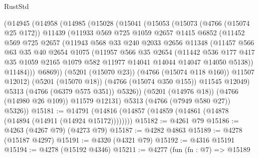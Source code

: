 \begin{lexlean}{RustStd}
\begin{coremodule}
      (@14945
        (@14958
          (@14985
            (@15028
              (@15041
                (@15053
                  (@15073
                    (@4766 (@15074 @25 @172))
                    @11439
                    (@11933
                      @569
                      @725
                      @1059
                      @2657
                      @1415
                      @6852
                      (@11452
                        @569
                        @725
                        @2657
                        (@11943
                          @568
                          @33
                          @240
                          @2033
                          @2656
                          @11348
                          (@11457
                            @566
                            @63
                            @35
                            @40
                            @2654
                            @1075
                            (@11957
                              @566
                              @35
                              @2654
                              (@11442
                                @536
                                @177
                                @417
                                @35
                                @1059
                                @2165
                                @1079
                                @582
                                @11977
                                @14041
                                @14044
                                @14047
                                @14050
                                @5138))
                            @11484)))
                      @6869))
                  (@5201 (@15070 @23))
                  (@4766 (@15074 @118 @160))
                  @11507
                  @12012)
                (@5201 (@15070 @18))
                (@4766 (@15074 @350 @155))
                @11545
                @12049)
              @5313
              (@4766 (@6379 @575 @351))
              @5326))
          (@5201 (@14976 @18))
          (@4766 (@14980 @26 @109))
          @11579
          @12131)
        @5313
        (@4766 (@7949 @580 @27))
        @5326))
@15181 := @14791 (@14816 (@14857 (@14859 (@14861 (@14878 (@14894 (@14911 (@14924 @15172))))))))
@15182 := @4261 @79
@15186 := @4263 (@4267 @79) (@4273 @79)
@15187 := @4282 @4863
@15189 := @4278 (@15187 @4297)
@15191 := @4320 (@4321 @79)
@15192 := @4316 @15191
@15194 := @4278 (@15192 @4346)
@15211 := @4277
    (fun (fn : @7) =>
    @15189

\end{coremodule}
\end{lexlean}
